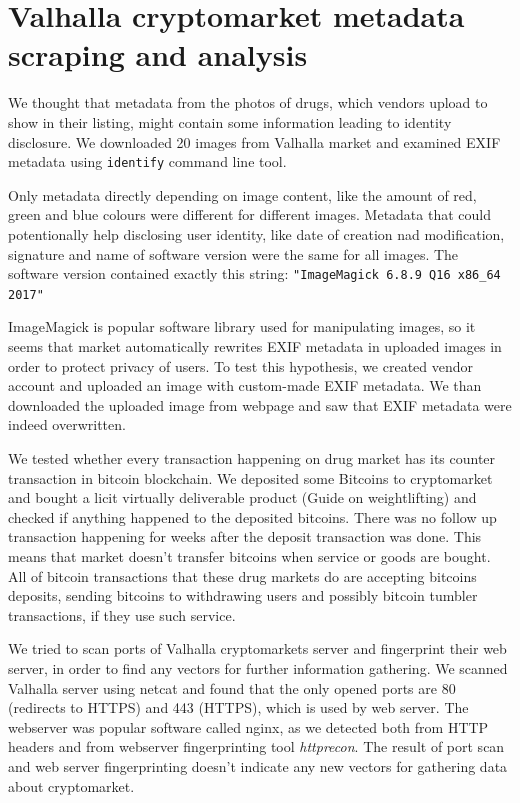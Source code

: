 \documentclass[
  digital, %
  table,   %
  lof,     %
  lot,     %
  oneside
]{fithesis3}
\begin{document}
\section{Valhalla cryptomarket metadata scraping and analysis}

We thought that metadata from the photos of drugs, which vendors upload
to show in their listing, might contain some information leading to identity disclosure.
We downloaded 20 images from Valhalla market and examined 
EXIF metadata using \texttt{identify} command line tool.

Only metadata directly depending on image content, like the amount of red, green and blue colours
were different for different images.
Metadata that could potentionally help disclosing user identity,
like date of creation nad modification, signature and name of software version were the same for all images.
The software version contained exactly this string:
\texttt{"ImageMagick 6.8.9 Q16 x86\_64 2017"}

ImageMagick is popular software library used for manipulating images, so it seems
that market automatically rewrites EXIF metadata in uploaded images in order to protect privacy of users.
To test this hypothesis, we created vendor account and uploaded an image with
custom-made EXIF metadata. We than downloaded the uploaded image from webpage and 
saw that EXIF metadata were indeed overwritten.

We tested whether every transaction happening on drug market has its counter transaction
in bitcoin blockchain.
We deposited some Bitcoins to cryptomarket and bought a licit virtually deliverable
product (Guide on weightlifting) and checked if anything happened to the deposited bitcoins.
There was no follow up transaction happening for weeks after the deposit transaction was done.
This means that market doesn't transfer bitcoins when service or goods are bought.
All of bitcoin transactions that these drug markets do 
are accepting bitcoins deposits,
sending bitcoins to withdrawing users and possibly bitcoin tumbler transactions, if they
use such service.

We tried to scan ports of Valhalla cryptomarkets server and fingerprint their web server,
in order to find any vectors for further information gathering. 
We scanned Valhalla server using netcat and found that the only opened ports are 80 (redirects to HTTPS) and 443 (HTTPS),
which is used by web server. The webserver was popular software called nginx, as we detected
both from HTTP headers and from webserver fingerprinting tool \emph{httprecon}.
The result of port scan and web server fingerprinting doesn't indicate
any new vectors for gathering data about cryptomarket.
\end{document}
